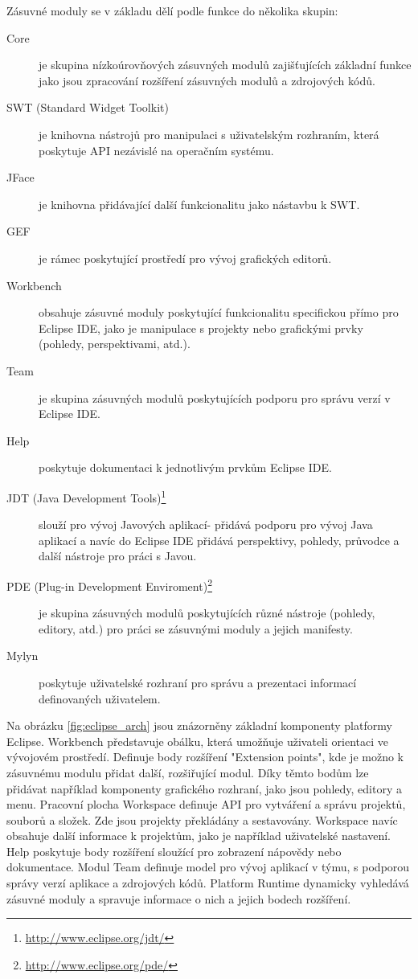   Zásuvné moduly se v základu dělí podle funkce do několika skupin:
  \begin{description}
    \item[Core] je skupina nízkoúrovňových zásuvných modulů zajišťujících základní funkce jako jsou zpracování rozšíření zásuvných modulů a zdrojových kódů.
    \item[SWT (Standard Widget Toolkit)] je knihovna nástrojů pro manipulaci s uživatelským rozhraním, která poskytuje API nezávislé na operačním systému.
    \item[JFace] je knihovna přidávající další funkcionalitu jako nástavbu k SWT.
    \item[GEF] je rámec poskytující prostředí pro vývoj grafických editorů.
    \item[Workbench] obsahuje zásuvné moduly poskytující funkcionalitu specifickou přímo pro Eclipse IDE, jako je manipulace s projekty nebo grafickými prvky (pohledy, perspektivami, atd.).
    \item[Team] je skupina zásuvných modulů poskytujících podporu pro správu verzí v Eclipse IDE.
    \item[Help] poskytuje dokumentaci k jednotlivým prvkům Eclipse IDE.
    \item[JDT (Java Development Tools)\footnote{\url{http://www.eclipse.org/jdt/}}] slouží pro vývoj Javových aplikací- přidává podporu pro vývoj Java aplikací a navíc do Eclipse IDE přidává perspektivy, pohledy, průvodce a další nástroje pro práci s Javou.
    \item[PDE (Plug-in Development Enviroment)\footnote{\url{http://www.eclipse.org/pde/}}] je skupina zásuvných modulů poskytujících různé nástroje (pohledy, editory, atd.) pro práci se zásuvnými moduly a jejich manifesty.
    \item[Mylyn] poskytuje uživatelské rozhraní pro správu a prezentaci informací definovaných uživatelem.
  \end{description}

  Na obrázku \ref{fig:eclipse_arch} jsou znázorněny základní komponenty platformy Eclipse. Workbench představuje obálku, která umožňuje uživateli orientaci ve vývojovém prostředí. Definuje body rozšíření "Extension points", kde je možno k zásuvnému modulu přidat další, rozšiřující modul. Díky těmto bodům lze přidávat například komponenty grafického rozhraní, jako jsou pohledy, editory a menu. Pracovní plocha Workspace definuje API pro vytváření a správu projektů, souborů a složek. Zde jsou projekty překládány a sestavovány. Workspace navíc obsahuje další informace k projektům, jako je například uživatelské nastavení. Help poskytuje body rozšíření sloužící pro zobrazení nápovědy nebo dokumentace. Modul Team definuje model pro vývoj aplikací v týmu, s podporou správy verzí aplikace a zdrojových kódů. Platform Runtime dynamicky vyhledává zásuvné moduly a spravuje informace o nich a jejich bodech rozšíření.

